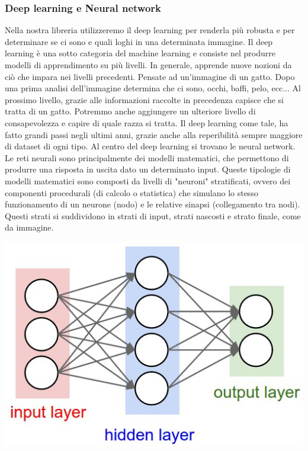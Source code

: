 \documentclass[twoside]{supsistudent}
\begin{document}
    \subsubsection{Deep learning e Neural network}
    Nella nostra libreria utilizzeremo il deep learning per renderla più robusta e per determinare se ci sono e quali loghi in una determinata immagine. Il deep learning è una sotto categoria del machine learning e consiste nel produrre modelli di apprendimento su più livelli. 
    In generale, apprende nuove nozioni da ciò che impara nei livelli precedenti. Pensate ad un'immagine di un gatto. Dopo una prima analisi dell'immagine determina che ci sono, occhi, baffi, pelo, ecc... Al prossimo livello, grazie alle informazioni raccolte in precedenza capisce che si tratta di un gatto. Potremmo anche aggiungere un ulteriore livello di consapevolezza e capire di quale razza si tratta. Il deep learning come tale, ha fatto grandi passi negli ultimi anni, grazie anche alla reperibilità sempre maggiore di dataset di ogni tipo. Al centro del deep learning si trovano le neural network. Le reti neurali sono principalmente dei modelli matematici, che permettono di produrre una risposta in uscita dato un determinato input.
Queste tipologie di modelli matematici sono composti da livelli di "neuroni" stratificati, ovvero dei componenti procedurali (di calcolo o statistica) che simulano lo stesso funzionamento di un neurone (nodo) e le relative sinapsi (collegamento tra nodi). Questi strati si suddividono in strati di input, strati nascosti e strato finale, come da immagine.

\includegraphics[width=\textwidth]{Pictures/neural_net.jpeg}
\end{document}
